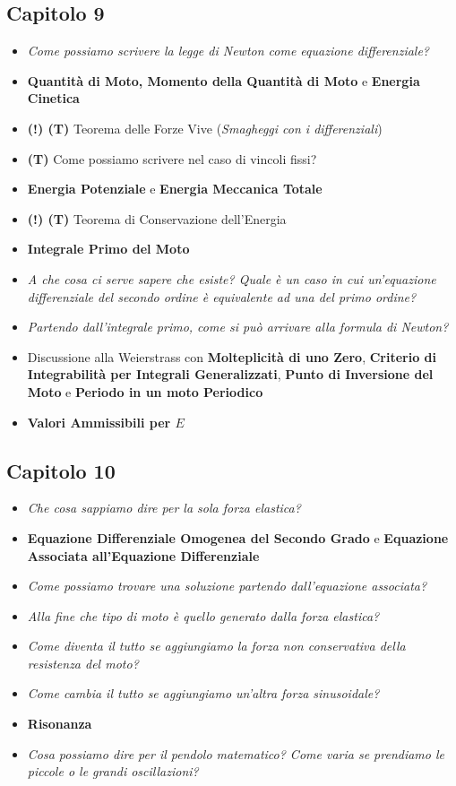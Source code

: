 \documentclass[11pt,a4paper,twoside]{article}
\begin{document}
\subsection*{Capitolo 9}

\begin{itemize}
	\item \textit{Come possiamo scrivere la legge di Newton come equazione differenziale?}
	\item \textbf{Quantità di Moto, Momento della Quantità di Moto} e \textbf{Energia Cinetica}
	\item \textbf{(!) (T)} Teorema delle Forze Vive (\textit{Smagheggi con i differenziali})
	\item \textbf{(T)} Come possiamo scrivere nel caso di vincoli fissi?
	\item \textbf{Energia Potenziale} e \textbf{Energia Meccanica Totale}
	\item \textbf{(!) (T)} Teorema di Conservazione dell'Energia
	\item \textbf{Integrale Primo del Moto}
	\item \textit{A che cosa ci serve sapere che esiste? Quale è un caso in cui un'equazione differenziale del secondo ordine è equivalente ad una del primo ordine?}
	\item \textit{Partendo dall'integrale primo, come si può arrivare alla formula di Newton?}
	\item Discussione alla Weierstrass con \textbf{Molteplicità di uno Zero}, \textbf{Criterio di Integrabilità per Integrali Generalizzati}, \textbf{Punto di Inversione del Moto} e \textbf{Periodo in un moto Periodico}
	\item \textbf{Valori Ammissibili per $E$}
\end{itemize}

\subsection*{Capitolo 10}

\begin{itemize}
	\item \textit{Che cosa sappiamo dire per la sola forza elastica?}
	\item \textbf{Equazione Differenziale Omogenea del Secondo Grado} e \textbf{Equazione Associata all'Equazione Differenziale}
	\item \textit{Come possiamo trovare una soluzione partendo dall'equazione associata?}
	\item \textit{Alla fine che tipo di moto è quello generato dalla forza elastica?}
	\item \textit{Come diventa il tutto se aggiungiamo la forza non conservativa della resistenza del moto?}
	\item \textit{Come cambia il tutto se aggiungiamo un'altra forza sinusoidale?}
	\item \textbf{Risonanza}
	\item \textit{Cosa possiamo dire per il pendolo matematico? Come varia se prendiamo le piccole o le grandi oscillazioni?}
\end{itemize}
\end{document}
